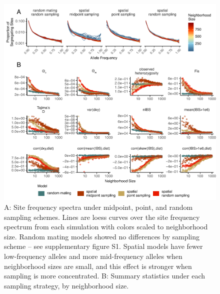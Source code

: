 \documentclass[10pt,twoside,lineno]{gsajnl}
\begin{document}
\begin{figure}[p]
\centering
\includegraphics[width=\textwidth]{figures/sfs_w_sumstats.pdf}
\caption{A: Site frequency spectra under midpoint, point, and random sampling schemes. Lines are loess curves over the site frequency spectrum from each simulation with colors scaled to neighborhood size. Random mating models showed no differences by sampling scheme -- see supplementary figure S1. Spatial models have fewer low-frequency alleles and more mid-frequency alleles when neighborhood sizes are small, and this effect is stronger when sampling is more concentrated. B: Summary statistics under each sampling strategy, by neighborhood size.}
\label{fig:sumstats}
\end{figure}
\end{document}
